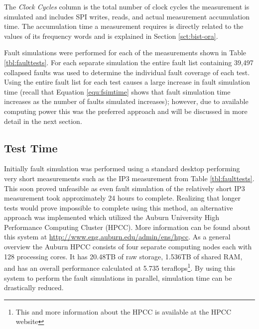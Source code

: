 \documentclass[12pt]{report}
\begin{document}
The \textit{Clock Cycles} column is the total number of clock cycles the measurement is simulated and includes SPI writes, reads, and actual measurement accumulation time.  The accumulation time a measurement requires is directly related to the values of its frequency words and is explained in Section \ref{sct:bist-ora}.

Fault simulations were performed for each of the measurements shown in Table \ref{tbl:faulttests}.  For each separate simulation the entire fault list containing 39,497 collapsed faults was used to determine the individual fault coverage of each test.  Using the entire fault list for each test causes a large increase in fault simulation time (recall that Equation \ref{equ:fsimtime} shows that fault simulation time increases as the number of faults simulated increases); however, due to available computing power this was the preferred approach and will be discussed in more detail in the next section.

\subsection{Test Time}
Initially fault simulation was performed using a standard desktop performing very short measurements such as the IP3 measurement from Table \ref{tbl:faulttests}.  This soon proved unfeasible as even fault simulation of the relatively short IP3 measurement took approximately 24 hours to complete.  Realizing that longer tests would prove impossible to complete using this method, an alternative approach was implemented which utilized the Auburn University High Performance Computing Cluster (HPCC).  More information can be found about this system at \url{http://www.eng.auburn.edu/admin/ens/hpcc}.  As a general overview the Auburn HPCC consists of four separate computing nodes each with 128 processing cores.  It has 20.48TB of raw storage, 1.536TB of shared RAM, and has an overall performance calculated at 5.735 teraflops\footnote{This and more information about the HPCC is available at the HPCC website}.  By using this system to perform the fault simulations in parallel, simulation time can be drastically reduced.
\end{document}
